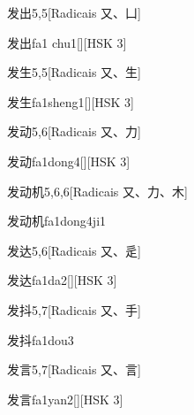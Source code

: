 \begin{entry}{发出}{5,5}[Radicais ⼜、⼐]
  \begin{phonetics}{发出}{fa1 chu1}[][HSK 3]
  \end{phonetics}
\end{entry}

\begin{entry}{发生}{5,5}[Radicais ⼜、⽣]
  \begin{phonetics}{发生}{fa1sheng1}[][HSK 3]
  \end{phonetics}
\end{entry}

\begin{entry}{发动}{5,6}[Radicais ⼜、⼒]
  \begin{phonetics}{发动}{fa1dong4}[][HSK 3]
  \end{phonetics}
\end{entry}

\begin{entry}{发动机}{5,6,6}[Radicais ⼜、⼒、⽊]
  \begin{phonetics}{发动机}{fa1dong4ji1}
  \end{phonetics}
\end{entry}

\begin{entry}{发达}{5,6}[Radicais ⼜、⾡]
  \begin{phonetics}{发达}{fa1da2}[][HSK 3]
  \end{phonetics}
\end{entry}

\begin{entry}{发抖}{5,7}[Radicais ⼜、⼿]
  \begin{phonetics}{发抖}{fa1dou3}
  \end{phonetics}
\end{entry}

\begin{entry}{发言}{5,7}[Radicais ⼜、⾔]
  \begin{phonetics}{发言}{fa1yan2}[][HSK 3]
  \end{phonetics}
\end{entry}


